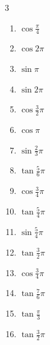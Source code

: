 \begin{multicols}{3}
\begin{enumerate}
  \item $\displaystyle \cos{\frac{\pi}{4}}$

  \item $\displaystyle \cos{2\pi}$
        \phantom{$\displaystyle =1$}

  \item $\displaystyle \sin{\pi}$
        \phantom{$\displaystyle =0$}

  \item $\displaystyle \sin{2\pi}$
        \phantom{$\displaystyle =0$}

  \item $\displaystyle \cos{\frac{3}{2}\pi}$
        \phantom{$\displaystyle =0$}

  \item $\displaystyle \cos{\pi}$
        \phantom{$\displaystyle =-1$}

  \item $\displaystyle \sin{\frac{2}{3}\pi}$

  \item $\displaystyle \tan{\frac{5}{6}\pi}$

  \item $\displaystyle \cos{\frac{3}{4}\pi}$

  \item $\displaystyle \tan{\frac{5}{4}\pi}$
        \phantom{$\displaystyle =1$}

  \item $\displaystyle \sin{\frac{5}{4}\pi}$

  \item $\displaystyle \tan{\frac{3}{2}\pi}$
        \phantom{$\displaystyle \quad なし$}

  \item $\displaystyle \cos{\frac{3}{4}\pi}$

  \item $\displaystyle \tan{\frac{7}{6}\pi}$

  \item $\displaystyle \tan{\frac{\pi}{3}}$

  \item $\displaystyle \tan{\frac{3}{2}\pi}$
        \phantom{$\displaystyle \quad なし$}


\end{enumerate}
\end{multicols}
